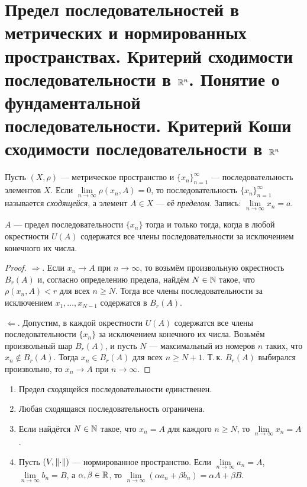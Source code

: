 \section{Предел последовательностей в метрических и нормированных пространствах. Критерий сходимости последовательности в $\mathbb{R}^n$. Понятие о фундаментальной последовательности. Критерий Коши сходимости последовательности в $\mathbb{R}^n$}

\begin{definition}
    Пусть $(X, \rho)$ --- метрическое пространство и $\{x_n\}_{n = 1}^\infty$ --- последовательность элементов $X$. Если $\lim\limits_{n \to \infty}\rho(x_n, A) = 0$, то последовательность $\{x_n\}_{n = 1}^\infty$ называется \textit{сходящейся}, а элемент $A \in X$ --- её \textit{пределом}. Запись: $\lim\limits_{n \to \infty}x_n = a$.
\end{definition}

\begin{proposal}
    $A$ --- предел последовательности $\{x_n\}$ тогда и только тогда, когда в любой окрестности $U(A)$ содержатся все члены последовательности за исключением конечного их числа.
\end{proposal}

\begin{proof}
    $\Rightarrow$. Если $x_n \to A$ при $n \to \infty$, то возьмём произвольную окрестность $B_r(A)$ и, согласно определению предела, найдём $N \in \mathbb{N}$ такое, что $\rho(x_n, A) < r$ для всех $n \geqslant N$. Тогда все члены последовательности за исключением $x_1, \ldots, x_{N - 1}$ содержатся в $B_r(A)$.

    $\Leftarrow$. Допустим, в каждой окрестности $U(A)$ содержатся все члены последовательности $\{x_n\}$ за исключением конечного их числа. Возьмём произвольный шар $B_r(A)$, и пусть $N$ --- максимальный из номеров $n$ таких, что $x_n \notin B_r(A)$. Тогда $x_n \in B_r(A)$ для всех $n \geqslant N + 1$. Т.\,к. $B_r(A)$ выбирался произвольно, то $x_n \to A$ при $n \to \infty$.
\end{proof}

\begin{theorem}
    \begin{enumerate}[nolistsep]
        \item Предел сходящейся последовательности единственен.
        \item Любая сходящаяся последовательность ограничена.
        \item Если найдётся $N \in \mathbb{N}$ такое, что $x_n = A$ для каждого $n \geqslant N$, то $\lim\limits_{n \to \infty}x_n = A$.
        \item Пусть $(V, \left\lVert\cdot\right\rVert)$ --- нормированное пространство. Если $\lim\limits_{n \to \infty}a_n = A$, $\lim\limits_{n \to \infty}b_n = B$, а $\alpha, \beta \in \mathbb{R}$, то $\lim\limits_{n \to \infty}(\alpha a_n + \beta b_n) = \alpha A + \beta B$.
    \end{enumerate}
\end{theorem}

